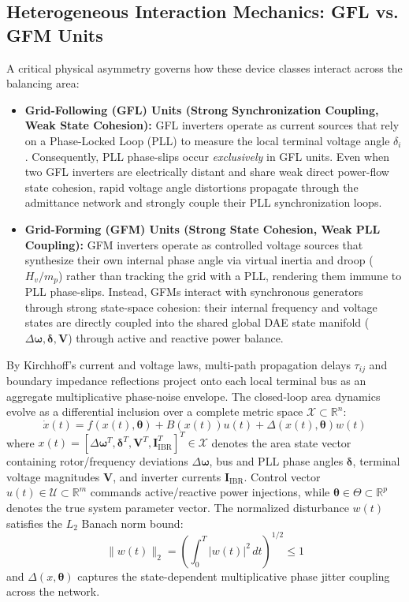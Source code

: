 \documentclass[journal]{IEEEtran}
\begin{document}
\subsection{Heterogeneous Interaction Mechanics: GFL vs. GFM Units}
A critical physical asymmetry governs how these device classes interact across the balancing area:
\begin{itemize}
    \item \textbf{Grid-Following (GFL) Units (Strong Synchronization Coupling, Weak State Cohesion):} GFL inverters operate as current sources that rely on a Phase-Locked Loop (PLL) to measure the local terminal voltage angle $\delta_i$. Consequently, PLL phase-slips occur \emph{exclusively} in GFL units. Even when two GFL inverters are electrically distant and share weak direct power-flow state cohesion, rapid voltage angle distortions propagate through the admittance network and strongly couple their PLL synchronization loops.
    \item \textbf{Grid-Forming (GFM) Units (Strong State Cohesion, Weak PLL Coupling):} GFM inverters operate as controlled voltage sources that synthesize their own internal phase angle via virtual inertia and droop ($H_v / m_p$) rather than tracking the grid with a PLL, rendering them immune to PLL phase-slips. Instead, GFMs interact with synchronous generators through strong state-space cohesion: their internal frequency and voltage states are directly coupled into the shared global DAE state manifold ($\Delta \bm{\omega}, \bm{\delta}, \bm{V}$) through active and reactive power balance.
\end{itemize} By Kirchhoff's current and voltage laws, multi-path propagation delays $\tau_{ij}$ and boundary impedance reflections project onto each local terminal bus as an aggregate multiplicative phase-noise envelope. The closed-loop area dynamics evolve as a differential inclusion over a complete metric space $\mathcal{X} \subset \mathbb{R}^n$:
\begin{equation}
    \dot{x}(t) = f(x(t), \bm{\theta}) + B(x(t))u(t) + \Delta(x(t), \bm{\theta})w(t)
\end{equation}
where $x(t) = [\Delta \bm{\omega}^T, \bm{\delta}^T, \bm{V}^T, \bm{I}_{\text{IBR}}^T]^T \in \mathcal{X}$ denotes the area state vector containing rotor/frequency deviations $\Delta \bm{\omega}$, bus and PLL phase angles $\bm{\delta}$, terminal voltage magnitudes $\bm{V}$, and inverter currents $\bm{I}_{\text{IBR}}$. Control vector $u(t) \in \mathcal{U} \subset \mathbb{R}^m$ commands active/reactive power injections, while $\bm{\theta} \in \Theta \subset \mathbb{R}^p$ denotes the true system parameter vector. The normalized disturbance $w(t)$ satisfies the $L_2$ Banach norm bound:
\begin{equation}
    \|w(t)\|_2 = \left( \int_0^T |w(t)|^2 \, dt \right)^{1/2} \le 1
\end{equation}
and $\Delta(x, \bm{\theta})$ captures the state-dependent multiplicative phase jitter coupling across the network.
\end{document}
